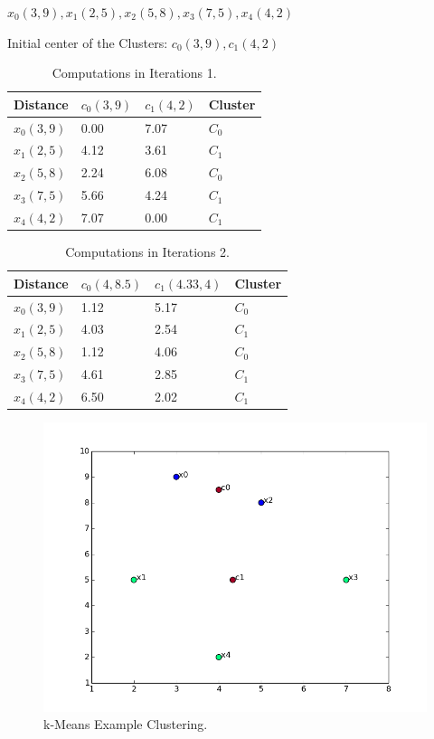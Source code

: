 $x_0(3,9), x_1(2,5), x_2(5,8), x_3(7,5), x_4(4,2)$

Initial center of the Clusters: $c_0(3,9), c_1(4,2)$

\begin{table}[htsb]
  \caption[Computations in Iterations 1]{Computations in Iterations 1.}\label{tab:kmeans_iter_1}
  \centering
  \begin{tabular}{l l l l}
    \toprule
      Distance & $c_0(3,9)$ & $c_1(4,2)$ & Cluster \\
    \midrule
        $x_0(3,9)$ & 0.00 & 7.07 & $C_0$ \\
        $x_1(2,5)$ & 4.12 & 3.61 & $C_1$ \\
        $x_2(5,8)$ & 2.24 & 6.08 & $C_0$ \\
        $x_3(7,5)$ & 5.66 & 4.24 & $C_1$ \\
        $x_4(4,2)$ & 7.07 & 0.00 & $C_1$ \\
    \bottomrule
  \end{tabular}
\end{table}


\begin{table}[htsb]
  \caption[Computations in Iterations 2]{Computations in Iterations 2.}\label{tab:kmeans_iter_1}
  \centering
  \begin{tabular}{l l l l}
    \toprule
      Distance & $c_0(4,8.5)$ & $c_1(4.33,4)$ & Cluster \\
    \midrule
        $x_0(3,9)$ & 1.12 & 5.17 & $C_0$ \\
        $x_1(2,5)$ & 4.03 & 2.54 & $C_1$ \\
        $x_2(5,8)$ & 1.12 & 4.06 & $C_0$ \\
        $x_3(7,5)$ & 4.61 & 2.85 & $C_1$ \\
        $x_4(4,2)$ & 6.50 & 2.02 & $C_1$ \\
    \bottomrule
  \end{tabular}
\end{table}


\begin{figure}[htsb]
  \centering
  \includegraphics[scale=0.5, trim="0cm 1cm 0cm 0cm"]{figures/kmeans_example}
  \caption[k-Means Example Clustering]{k-Means Example Clustering.}\label{fig:kmeans_example}
\end{figure}




